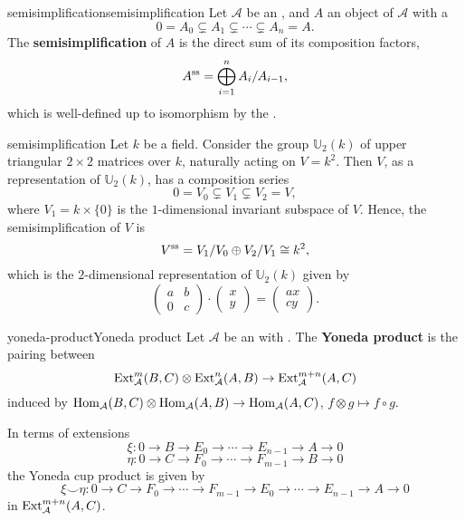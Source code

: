 \begin{topic}{semisimplification}{semisimplification}
    Let $\mathcal{A}$ be an , and $A$ an object of $\mathcal{A}$ with a 
    \[ 0 = A_0 \subsetneq A_1 \subsetneq \cdots \subsetneq A_n = A . \]
    The \textbf{semisimplification} of $A$ is the direct sum of its composition factors,
    \[ A^\textup{ss} = \bigoplus_{i = 1}^{n} A_i / A_{i - 1} , \]
    which is well-defined up to isomorphism by the .
\end{topic}

\begin{example}{semisimplification}
    Let $k$ be a field. Consider the group $\mathbb{U}_2(k)$ of upper triangular $2 \times 2$ matrices over $k$, naturally acting on $V = k^2$. Then $V$, as a representation of $\mathbb{U}_2(k)$, has a composition series
    \[ 0 = V_0 \subsetneq V_1 \subsetneq V_2 = V , \]
    where $V_1 = k \times \{ 0 \}$ is the $1$-dimensional invariant subspace of $V$. Hence, the semisimplification of $V$ is
    \[ V^\textup{ss} = V_1/V_0 \oplus V_2/V_1 \cong k^2 , \]
    which is the $2$-dimensional representation of $\mathbb{U}_2(k)$ given by
    \[ \begin{pmatrix} a & b \\ 0 & c \end{pmatrix} \cdot \begin{pmatrix} x \\ y \end{pmatrix} = \begin{pmatrix} a x \\ c y \end{pmatrix} . \]
\end{example}

\begin{topic}{yoneda-product}{Yoneda product}
    Let $\mathcal{A}$ be an  with . The \textbf{Yoneda product} is the pairing between 
    \[ \textup{Ext}_\mathcal{A}^m(B, C) \otimes \textup{Ext}_\mathcal{A}^n(A, B) \to \textup{Ext}_\mathcal{A}^{m + n}(A, C) \]
    induced by $\operatorname{Hom}_\mathcal{A}(B, C) \otimes \operatorname{Hom}_\mathcal{A}(A, B) \to \operatorname{Hom}_\mathcal{A}(A, C)$, $f \otimes g \mapsto f \circ g$.
    
    In terms of extensions
    \[ \xi \colon 0 \to B \to E_0 \to \cdots \to E_{n - 1} \to A \to 0 \]
    \[ \eta \colon 0 \to C \to F_0 \to \cdots \to F_{m - 1} \to B \to 0 \]
    the Yoneda cup product is given by
    \[ \xi \smile \eta \colon 0 \to C \to F_0 \to \cdots \to F_{m - 1} \to E_0 \to \cdots \to E_{n - 1} \to A \to 0 \]
    in $\textup{Ext}_\mathcal{A}^{m + n}(A, C)$.
\end{topic}

